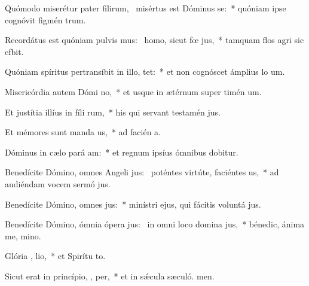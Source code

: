 \item Quómodo miserétur pater filirum,~\pscross{} misértus est Dóminus  se:~* quóniam ipse cognóvit figmén trum.
\item Recordátus est quóniam pulvis mus:~\pscross{} homo, sicut fœ  jus,~* tamquam flos agri sic efbit.
\item Quóniam spíritus pertransíbit in illo,   tet:~* et non cognóscet ámplius lo um.
\item Misericórdia autem Dómi  no,~* et usque in ætérnum super timén um.
\item Et justítia illíus in fíli rum,~* his qui servant testamén jus.
\item Et mémores sunt manda us,~* ad facién a.
\item Dóminus in cælo pará  am:~* et regnum ipsíus ómnibus dobitur.
\item Benedícite Dómino, omnes Angeli jus:~\pscross{} poténtes virtúte, faciéntes  us,~* ad audiéndam vocem sermó jus.
\item Benedícite Dómino, omnes  jus:~* minístri ejus, qui fácitis voluntá jus.
\item Benedícite Dómino, ómnia ópera jus:~\pscross{} in omni loco domina jus,~* bénedic, ánima me, mino.
\item Glória ,  lio,~* et Spirítu to.
\item Sicut erat in princípio,  ,  per,~* et in sǽcula sæculó. men.
